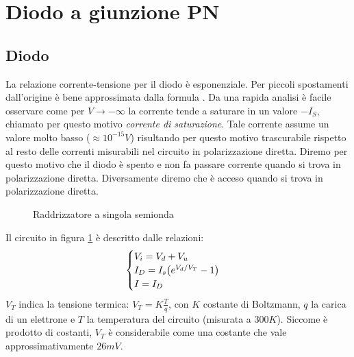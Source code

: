 \documentclass[../elettronica]{subfiles}
\begin{document}
\section{Diodo a giunzione PN}
\subsection{Diodo}
\noindent
La relazione corrente-tensione per il diodo è esponenziale. Per piccoli spostamenti dall'origine è bene approssimata dalla
formula . Da una rapida analisi è facile osservare come per $V \to -\infty$ la corrente tende a saturare in
un valore $-I_S$, chiamato per questo motivo \textit{corrente di saturazione}.
Tale corrente assume un valore molto basso ($\approx 10^{-15} V$) risultando per questo motivo trascurabile rispetto al
resto delle correnti misurabili nel circuito in polarizzazione diretta.
Diremo per questo motivo che il diodo è spento e non fa passare corrente quando si trova in polarizzazione diretta.
Diversamente diremo che è acceso quando si trova in polarizzazione diretta.

\begin{figure}[h]
    \centering
    \caption{Raddrizzatore a singola semionda}
    \label{fig:singola_semionda}
\end{figure}

\noindent
Il circuito in figura \ref{fig:singola_semionda} è descritto dalle relazioni:
\[
    \begin{cases}
        V_i = V_d + V_u
        \\
        I_D = I_s \big(e^{V_d/V_T} -1\big)
        \\
        I = I_D
    \end{cases}
\]
$V_T$ indica la tensione termica: $V_T = K \frac{T}{q}$, con $K$ costante di Boltzmann, $q$ la carica di un elettrone e
$T$ la temperatura del circuito (misurata a $300K$).
Siccome è prodotto di costanti, $V_T$ è considerabile come una costante che vale approssimativamente $26mV$.
\end{document}
